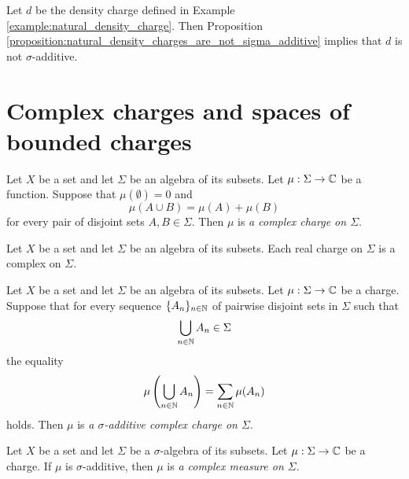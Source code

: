 \begin{remark}\label{remark:natural_density_is_not_sigma_additive}
    Let $d$ be the density charge defined in Example \ref{example:natural_density_charge}. Then Proposition \ref{proposition:natural_density_charges_are_not_sigma_additive} implies that $d$ is not $\sigma$-additive.
\end{remark}

\section{Complex charges and spaces of bounded charges}

\begin{definition}
    Let $X$ be a set and let $\Sigma$ be an algebra of its subsets. Let $\mu:\Sigma \rightarrow {\mathbb C}$ be a function. Suppose that $\mu(\emptyset) = 0$ and
    $$\mu(A \cup B) = \mu(A) + \mu(B)$$
    for every pair of disjoint sets $A,B \in \Sigma$. Then $\mu$ is \textit{a complex charge on $\Sigma$}.
\end{definition}

\begin{remark}\label{remark:each_real_charge_is_complex}
    Let $X$ be a set and let $\Sigma$ be an algebra of its subsets. Each real charge on $\Sigma$ is a complex on $\Sigma$.
\end{remark}

\begin{definition}
    Let $X$ be a set and let $\Sigma$ be an algebra of its subsets. Let $\mu:\Sigma \rightarrow {\mathbb C}$ be a charge. Suppose that for every sequence $\{A_n\}_{n\in {\mathbb N}}$ of pairwise disjoint sets in $\Sigma$ such that
    $$\bigcup_{n\in {\mathbb N}}A_n \in \Sigma$$
    the equality
    $$\mu\left(\bigcup_{n\in {\mathbb N}}A_n\right) = \sum_{n \in {\mathbb N}}\mu(A_n)$$
    holds. Then $\mu$ is \textit{a $\sigma$-additive complex charge on $\Sigma$}.
\end{definition}

\begin{definition}
    Let $X$ be a set and let $\Sigma$ be a $\sigma$-algebra of its subsets. Let $\mu:\Sigma \rightarrow {\mathbb C}$ be a charge. If $\mu$ is $\sigma$-additive, then $\mu$ is \textit{a complex measure on $\Sigma$}.
\end{definition}

